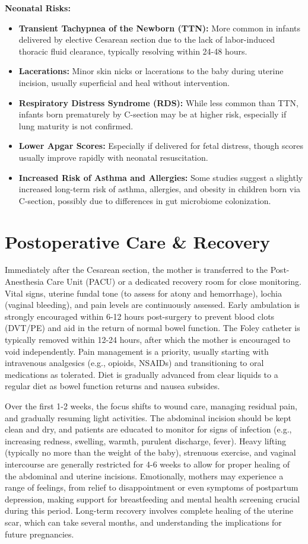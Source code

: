\textbf{Neonatal Risks:}
\begin{itemize}
  \item \textbf{Transient Tachypnea of the Newborn (TTN):} More common in infants delivered by elective Cesarean section due to the lack of labor-induced thoracic fluid clearance, typically resolving within 24-48 hours.
  \item \textbf{Lacerations:} Minor skin nicks or lacerations to the baby during uterine incision, usually superficial and heal without intervention.
  \item \textbf{Respiratory Distress Syndrome (RDS):} While less common than TTN, infants born prematurely by C-section may be at higher risk, especially if lung maturity is not confirmed.
  \item \textbf{Lower Apgar Scores:} Especially if delivered for fetal distress, though scores usually improve rapidly with neonatal resuscitation.
  \item \textbf{Increased Risk of Asthma and Allergies:} Some studies suggest a slightly increased long-term risk of asthma, allergies, and obesity in children born via C-section, possibly due to differences in gut microbiome colonization.
\end{itemize}

\section*{Postoperative Care \& Recovery}
Immediately after the Cesarean section, the mother is transferred to the Post-Anesthesia Care Unit (PACU) or a dedicated recovery room for close monitoring. Vital signs, uterine fundal tone (to assess for atony and hemorrhage), lochia (vaginal bleeding), and pain levels are continuously assessed. Early ambulation is strongly encouraged within 6-12 hours post-surgery to prevent blood clots (DVT/PE) and aid in the return of normal bowel function. The Foley catheter is typically removed within 12-24 hours, after which the mother is encouraged to void independently. Pain management is a priority, usually starting with intravenous analgesics (e.g., opioids, NSAIDs) and transitioning to oral medications as tolerated. Diet is gradually advanced from clear liquids to a regular diet as bowel function returns and nausea subsides.

Over the first 1-2 weeks, the focus shifts to wound care, managing residual pain, and gradually resuming light activities. The abdominal incision should be kept clean and dry, and patients are educated to monitor for signs of infection (e.g., increasing redness, swelling, warmth, purulent discharge, fever). Heavy lifting (typically no more than the weight of the baby), strenuous exercise, and vaginal intercourse are generally restricted for 4-6 weeks to allow for proper healing of the abdominal and uterine incisions. Emotionally, mothers may experience a range of feelings, from relief to disappointment or even symptoms of postpartum depression, making support for breastfeeding and mental health screening crucial during this period. Long-term recovery involves complete healing of the uterine scar, which can take several months, and understanding the implications for future pregnancies.

